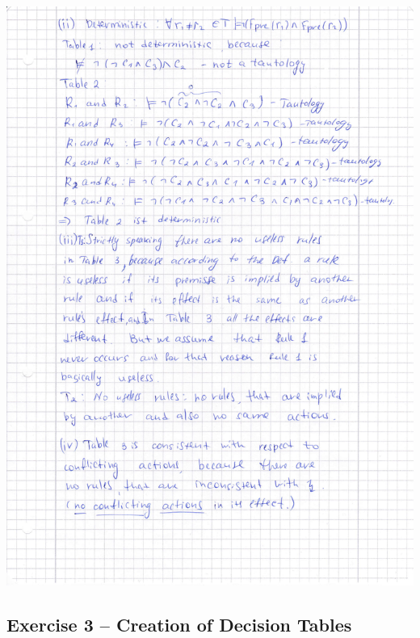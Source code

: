 \documentclass{scrartcl}
\begin{document}
\includegraphics[scale=0.8]{Ex2b.pdf}

\subsection*{Exercise 3 – Creation of Decision Tables}
\end{document}
